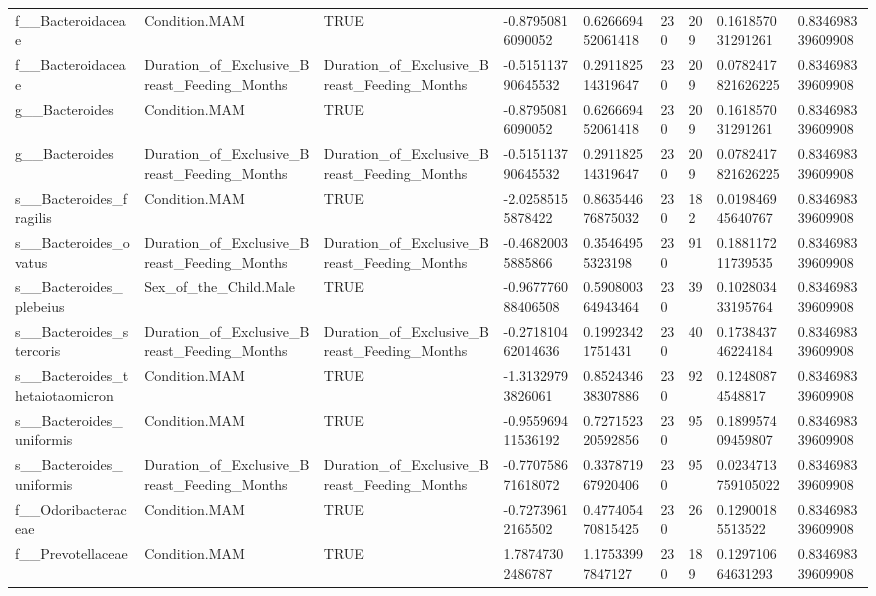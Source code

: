 \begin{longtable}{lllllllll}
f\_\_Bacteroidaceae & Condition.MAM & TRUE & -0.87950816090052 & 0.626669452061418 & 230 & 209 & 0.161857031291261 & 0.834698339609908 \\
f\_\_Bacteroidaceae & Duration\_of\_Exclusive\_Breast\_Feeding\_Months & Duration\_of\_Exclusive\_Breast\_Feeding\_Months & -0.515113790645532 & 0.291182514319647 & 230 & 209 & 0.0782417821626225 & 0.834698339609908 \\
g\_\_Bacteroides & Condition.MAM & TRUE & -0.87950816090052 & 0.626669452061418 & 230 & 209 & 0.161857031291261 & 0.834698339609908 \\
g\_\_Bacteroides & Duration\_of\_Exclusive\_Breast\_Feeding\_Months & Duration\_of\_Exclusive\_Breast\_Feeding\_Months & -0.515113790645532 & 0.291182514319647 & 230 & 209 & 0.0782417821626225 & 0.834698339609908 \\
s\_\_Bacteroides\_fragilis & Condition.MAM & TRUE & -2.02585155878422 & 0.863544676875032 & 230 & 182 & 0.019846945640767 & 0.834698339609908 \\
s\_\_Bacteroides\_ovatus & Duration\_of\_Exclusive\_Breast\_Feeding\_Months & Duration\_of\_Exclusive\_Breast\_Feeding\_Months & -0.46820035885866 & 0.35464955323198 & 230 & 91 & 0.188117211739535 & 0.834698339609908 \\
s\_\_Bacteroides\_plebeius & Sex\_of\_the\_Child.Male & TRUE & -0.967776088406508 & 0.590800364943464 & 230 & 39 & 0.102803433195764 & 0.834698339609908 \\
s\_\_Bacteroides\_stercoris & Duration\_of\_Exclusive\_Breast\_Feeding\_Months & Duration\_of\_Exclusive\_Breast\_Feeding\_Months & -0.271810462014636 & 0.19923421751431 & 230 & 40 & 0.173843746224184 & 0.834698339609908 \\
s\_\_Bacteroides\_thetaiotaomicron & Condition.MAM & TRUE & -1.31329793826061 & 0.852434638307886 & 230 & 92 & 0.12480874548817 & 0.834698339609908 \\
s\_\_Bacteroides\_uniformis & Condition.MAM & TRUE & -0.955969411536192 & 0.727152320592856 & 230 & 95 & 0.189957409459807 & 0.834698339609908 \\
s\_\_Bacteroides\_uniformis & Duration\_of\_Exclusive\_Breast\_Feeding\_Months & Duration\_of\_Exclusive\_Breast\_Feeding\_Months & -0.770758671618072 & 0.337871967920406 & 230 & 95 & 0.0234713759105022 & 0.834698339609908 \\
f\_\_Odoribacteraceae & Condition.MAM & TRUE & -0.72739612165502 & 0.477405470815425 & 230 & 26 & 0.12900185513522 & 0.834698339609908 \\
f\_\_Prevotellaceae & Condition.MAM & TRUE & 1.78747302486787 & 1.17533997847127 & 230 & 189 & 0.129710664631293 & 0.834698339609908 \\

\end{longtable}
